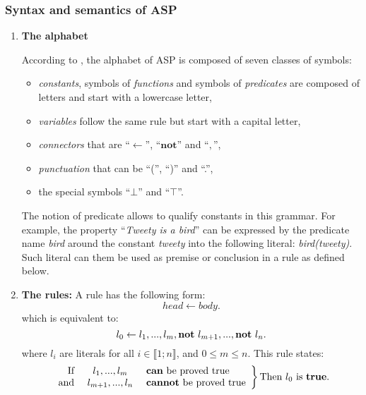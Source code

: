 \subsubsection{Syntax and semantics of ASP}
\label{sectionSyntaxeASP}
\begin{enumerate}

\item \textbf{The alphabet}

According to \cite{baral2003knowledge}, the alphabet of ASP is composed of seven classes of symbols:
\begin{itemize}
  \item \emph{constants}, symbols of \emph{functions} and symbols of \emph{predicates} are composed of letters and start with a lowercase letter,
  \item \emph{variables} follow the same rule but start with a capital letter,
  \item \emph{connectors} that are “$\leftarrow$”, “$\textbf{not}$” and “$,$”,
  \item \emph{punctuation} that can be “(”, “)” and “.”,
  \item the special symbols “$\bot$” and “$\top$”.
\end{itemize}

The notion of predicate allows to qualify constants in this grammar.
For example, the property “\textit{Tweety is a bird}”
can be expressed by the predicate name \textit{bird}
around the constant \textit{tweety} into the following literal:
\textit{bird(tweety)}.
Such literal can them be used as premise or conclusion in a rule as defined below.

\item \textbf{The rules:}
A rule has the following form:
\begin{equation} \label{eq1ASP}
 head \leftarrow body.
\end{equation}
which is equivalent to:
\begin{equation} \label{eq2ASP}
l_{0} \leftarrow l_{1},...,l_{m}, \textbf{not}~ l_{m+1},..., \textbf{not}~ l_{n}.
\end{equation}
where $l_{i}$ are literals for all $i \in \llbracket 1 ; n \rrbracket$, and $0 \leq m \leq n$.
This rule states:
\[
\left.
    \begin{array}{rcl}
        \text{If } & l_{1},...,l_{m}  & \text{ \textbf{can} be proved true}\\
        \text{and } & l_{m+1},...,l_{n} & \text{ \textbf{cannot} be proved true}
    \end{array}
\right \} \text{Then} ~ l_{0} ~ \text{is } \textbf{true}.
\]


\end{enumerate}
